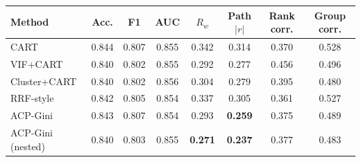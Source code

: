 \begin{tabular}{lccccccc}
\toprule
Method & Acc. & F1 & AUC & $R_w$ & Path $|r|$ & Rank corr. & Group corr. \\
\midrule
CART & 0.844 & 0.807 & 0.855 & 0.342 & 0.314 & 0.370 & 0.528 \\
VIF+CART & 0.840 & 0.802 & 0.855 & 0.292 & 0.277 & 0.456 & 0.496 \\
Cluster+CART & 0.840 & 0.802 & 0.856 & 0.304 & 0.279 & 0.395 & 0.480 \\
RRF-style & 0.842 & 0.805 & 0.854 & 0.337 & 0.305 & 0.361 & 0.527 \\
ACP-Gini & 0.843 & 0.807 & 0.854 & 0.293 & \textbf{0.259} & 0.375 & 0.489 \\
ACP-Gini (nested) & 0.840 & 0.803 & 0.855 & \textbf{0.271} & \textbf{0.237} & 0.377 & 0.483 \\
\bottomrule
\end{tabular}
